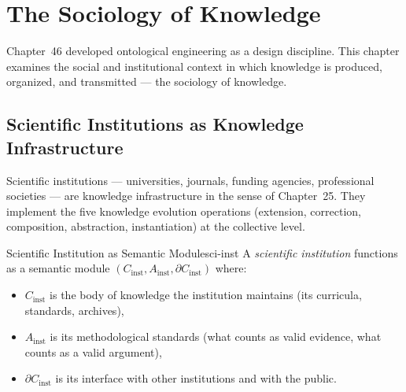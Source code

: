 \chapter{The Sociology of Knowledge}



Chapter~46 developed ontological engineering as a design discipline.
This chapter examines the social and institutional context in which
knowledge is produced, organized, and transmitted — the sociology of
knowledge.

\section{Scientific Institutions as Knowledge Infrastructure}

Scientific institutions — universities, journals, funding agencies,
professional societies — are knowledge infrastructure in the sense of
Chapter~25. They implement the five knowledge evolution operations
(extension, correction, composition, abstraction, instantiation)
at the collective level.

\begin{definition}{Scientific Institution as Semantic Module}{sci-inst}
  A \emph{scientific institution} functions as a semantic module
  $(C_\text{inst}, A_\text{inst}, \partial C_\text{inst})$ where:
  \begin{itemize}
    \item $C_\text{inst}$ is the body of knowledge the institution
          maintains (its curricula, standards, archives),
    \item $A_\text{inst}$ is its methodological standards (what counts
          as valid evidence, what counts as a valid argument),
    \item $\partial C_\text{inst}$ is its interface with other
          institutions and with the public.
  \end{itemize}
\end{definition}

